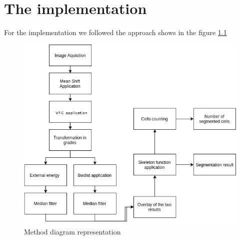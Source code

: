\chapter{The implementation}
For the implementation we followed the approach shows in the figure \ref{fig:diag}
\begin{figure}
	\begin{center}
		\centering
		\includegraphics[scale=0.5]{img/diag.png}
		\caption{Method diagram representation}
		\label{fig:diag}
	\end{center}
\end{figure}

